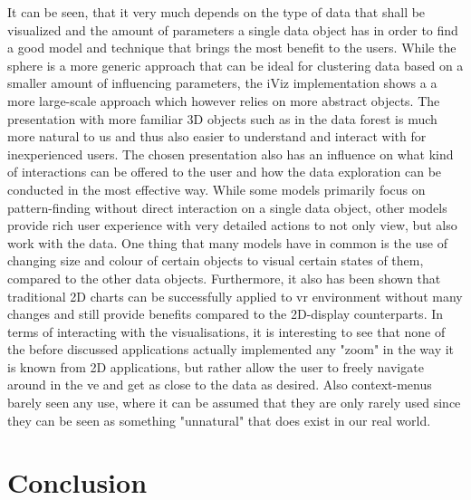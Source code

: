 It can be seen, that it very much depends on the type of data that shall be visualized and the amount of parameters a single data object has in order to find a good model and technique that brings the most benefit to the users. While the sphere is a more generic approach that can be ideal for clustering data based on a smaller amount of influencing parameters, the iViz implementation shows a a more large-scale approach which however relies on more abstract objects. The presentation with more familiar 3D objects such as in the data forest is much more natural to us and thus also easier to understand and interact with for inexperienced users. \newline
The chosen presentation also has an influence on what kind of interactions can be offered to the user and how the data exploration can be conducted in the most effective way. While some models primarily focus on pattern-finding without direct interaction on a single data object, other models provide rich user experience with very detailed actions to not only view, but also work with the data. One thing that many models have in common is the use of changing size and colour of certain objects to visual certain states of them, compared to the other data objects. Furthermore, it also has been shown that traditional 2D charts can be successfully applied to \gls{vr} environment without many changes and still provide benefits compared to the 2D-display counterparts. \newline
In terms of interacting with the visualisations, it is interesting to see that none of the before discussed applications actually implemented any "zoom" in the way it is known from 2D applications, but rather allow the user to freely navigate around in the \gls{ve} and get as close to the data as desired. Also context-menus barely seen any use, where it can be assumed that they are only rarely used since they can be seen as something "unnatural" that does exist in our real world.



\section{Conclusion}

\label{SectionLiteratureReviewConclusion}

